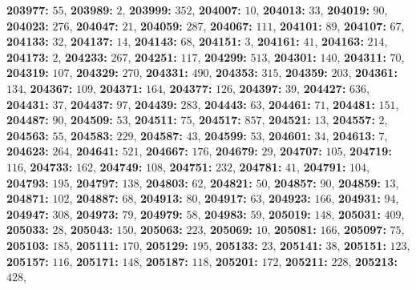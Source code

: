 \textsf{\bfseries 203977:} $55$, \textsf{\bfseries 203989:} $2$, \textsf{\bfseries 203999:} $352$, \textsf{\bfseries 204007:} $10$, \textsf{\bfseries 204013:} $33$, \textsf{\bfseries 204019:} $90$, \textsf{\bfseries 204023:} $276$, \textsf{\bfseries 204047:} $21$, \textsf{\bfseries 204059:} $287$, \textsf{\bfseries 204067:} $111$, \textsf{\bfseries 204101:} $89$, \textsf{\bfseries 204107:} $67$, \textsf{\bfseries 204133:} $32$, \textsf{\bfseries 204137:} $14$, \textsf{\bfseries 204143:} $68$, \textsf{\bfseries 204151:} $3$, \textsf{\bfseries 204161:} $41$, \textsf{\bfseries 204163:} $214$, \textsf{\bfseries 204173:} $2$, \textsf{\bfseries 204233:} $267$, \textsf{\bfseries 204251:} $117$, \textsf{\bfseries 204299:} $513$, \textsf{\bfseries 204301:} $140$, \textsf{\bfseries 204311:} $70$, \textsf{\bfseries 204319:} $107$, \textsf{\bfseries 204329:} $270$, \textsf{\bfseries 204331:} $490$, \textsf{\bfseries 204353:} $315$, \textsf{\bfseries 204359:} $203$, \textsf{\bfseries 204361:} $134$, \textsf{\bfseries 204367:} $109$, \textsf{\bfseries 204371:} $164$, \textsf{\bfseries 204377:} $126$, \textsf{\bfseries 204397:} $39$, \textsf{\bfseries 204427:} $636$, \textsf{\bfseries 204431:} $37$, \textsf{\bfseries 204437:} $97$, \textsf{\bfseries 204439:} $283$, \textsf{\bfseries 204443:} $63$, \textsf{\bfseries 204461:} $71$, \textsf{\bfseries 204481:} $151$, \textsf{\bfseries 204487:} $90$, \textsf{\bfseries 204509:} $53$, \textsf{\bfseries 204511:} $75$, \textsf{\bfseries 204517:} $857$, \textsf{\bfseries 204521:} $13$, \textsf{\bfseries 204557:} $2$, \textsf{\bfseries 204563:} $55$, \textsf{\bfseries 204583:} $229$, \textsf{\bfseries 204587:} $43$, \textsf{\bfseries 204599:} $53$, \textsf{\bfseries 204601:} $34$, \textsf{\bfseries 204613:} $7$, \textsf{\bfseries 204623:} $264$, \textsf{\bfseries 204641:} $521$, \textsf{\bfseries 204667:} $176$, \textsf{\bfseries 204679:} $29$, \textsf{\bfseries 204707:} $105$, \textsf{\bfseries 204719:} $116$, \textsf{\bfseries 204733:} $162$, \textsf{\bfseries 204749:} $108$, \textsf{\bfseries 204751:} $232$, \textsf{\bfseries 204781:} $41$, \textsf{\bfseries 204791:} $104$, \textsf{\bfseries 204793:} $195$, \textsf{\bfseries 204797:} $138$, \textsf{\bfseries 204803:} $62$, \textsf{\bfseries 204821:} $50$, \textsf{\bfseries 204857:} $90$, \textsf{\bfseries 204859:} $13$, \textsf{\bfseries 204871:} $102$, \textsf{\bfseries 204887:} $68$, \textsf{\bfseries 204913:} $80$, \textsf{\bfseries 204917:} $63$, \textsf{\bfseries 204923:} $166$, \textsf{\bfseries 204931:} $94$, \textsf{\bfseries 204947:} $308$, \textsf{\bfseries 204973:} $79$, \textsf{\bfseries 204979:} $58$, \textsf{\bfseries 204983:} $59$, \textsf{\bfseries 205019:} $148$, \textsf{\bfseries 205031:} $409$, \textsf{\bfseries 205033:} $28$, \textsf{\bfseries 205043:} $150$, \textsf{\bfseries 205063:} $223$, \textsf{\bfseries 205069:} $10$, \textsf{\bfseries 205081:} $166$, \textsf{\bfseries 205097:} $75$, \textsf{\bfseries 205103:} $185$, \textsf{\bfseries 205111:} $170$, \textsf{\bfseries 205129:} $195$, \textsf{\bfseries 205133:} $23$, \textsf{\bfseries 205141:} $38$, \textsf{\bfseries 205151:} $123$, \textsf{\bfseries 205157:} $116$, \textsf{\bfseries 205171:} $148$, \textsf{\bfseries 205187:} $118$, \textsf{\bfseries 205201:} $172$, \textsf{\bfseries 205211:} $228$, \textsf{\bfseries 205213:} $428$, 
